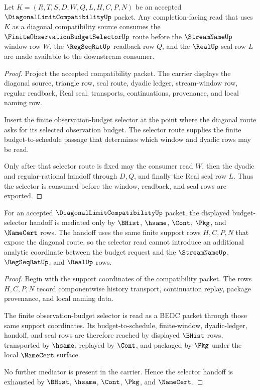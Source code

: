 \begin{theorem}\label{thm:diagonal-limit-compatibility-budget-selector-carrier}
Let $K=(R,T,S,D,W,Q,L,H,C,P,N)$ be an accepted $\DiagonalLimitCompatibilityUp$ packet. Any completion-facing read that uses $K$ as a diagonal compatibility source consumes the $\FiniteObservationBudgetSelectorUp$ route before the $\StreamNameUp$ window row $W$, the $\RegSeqRatUp$ readback row $Q$, and the $\RealUp$ seal row $L$ are made available to the downstream consumer.
\end{theorem}
\begin{proof}
Project the accepted compatibility packet. The carrier displays the diagonal source, triangle row, seal route, dyadic ledger, stream-window row, regular readback, Real seal, transports, continuations, provenance, and local naming row.

Insert the finite observation-budget selector at the point where the diagonal route asks for its selected observation budget. The selector route supplies the finite budget-to-schedule passage that determines which window and dyadic rows may be read.

Only after that selector route is fixed may the consumer read $W$, then the dyadic and regular-rational handoff through $D,Q$, and finally the Real seal row $L$. Thus the selector is consumed before the window, readback, and seal rows are exported.
\end{proof}

\begin{theorem}\label{thm:diagonal-limit-compatibility-budget-selector-route}
For an accepted $\DiagonalLimitCompatibilityUp$ packet, the displayed budget-selector handoff is mediated only by $\BHist$, $\hsame$, $\Cont$, $\Pkg$, and $\NameCert$ rows. The handoff uses the same finite support rows $H,C,P,N$ that expose the diagonal route, so the selector read cannot introduce an additional analytic coordinate between the budget request and the $\StreamNameUp$, $\RegSeqRatUp$, and $\RealUp$ rows.
\end{theorem}
\begin{proof}
Begin with the support coordinates of the compatibility packet. The rows $H,C,P,N$ record componentwise history transport, continuation replay, package provenance, and local naming data.

The finite observation-budget selector is read as a BEDC packet through those same support coordinates. Its budget-to-schedule, finite-window, dyadic-ledger, handoff, and seal rows are therefore reached by displayed $\BHist$ rows, transported by $\hsame$, replayed by $\Cont$, and packaged by $\Pkg$ under the local $\NameCert$ surface.

No further mediator is present in the carrier. Hence the selector handoff is exhausted by $\BHist$, $\hsame$, $\Cont$, $\Pkg$, and $\NameCert$.
\end{proof}

